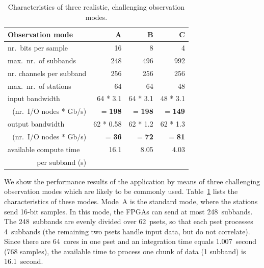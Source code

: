 \documentclass{sig-alternate}
\begin{document}
\begin{table}[ht]
\begin{center}
\begin{small}
\begin{tabular}{|l|rrr|}
\hline
Observation mode	 & \textsf{A}	& \textsf{B}	& \textsf{C}	\\
\hline
nr.\ bits per sample	 & 16		& 8		& 4	\\
max.\ nr.\ of subbands	 & 248		& 496		& 992	\\
nr. channels per subband & 256		& 256		& 256	\\
max.\ nr.\ of stations	 & 64		& 64		& 48	\\
\hline
input bandwidth & 64 * 3.1  & 64 * 3.1 & 48 * 3.1 \\
\multicolumn{1}{|r|}{(nr.\ I/O nodes * Gb/s)} & = \textbf{198} & = \textbf{198} & = \textbf{149} \\
output bandwidth & 62 * 0.58 & 62 * 1.2 & 62 * 1.3 \\
\multicolumn{1}{|r|}{(nr.\ I/O nodes * Gb/s)}  & = \textbf{36} & = \textbf{72} & = \textbf{81} \\
\hline
available compute time	 & 16.1	     & 8.05     & 4.03     \\
\multicolumn{1}{|r|}{per subband (s)}	 & & & \\
\hline
\end{tabular}
\end{small}
\end{center}
\caption{Characteristics of three realistic, challenging observation modes.}
\label{tab:observation-characteristics}
\end{table}

We show the performance results of the application by means of three
challenging observation modes which are likely to be commonly used.
Table~\ref{tab:observation-characteristics} lists the characteristics of these modes.
Mode~\textsf{A} is the standard mode, where the stations send 16-bit samples.
In this mode, the FPGAs can send at most 248~subbands.
The 248~subbands are evenly divided over 62~psets, so that each pset processes
4~subbands (the remaining two psets handle input data, but do not correlate).
Since there are 64~cores in one pset and an integration time equals
1.007~second (768 samples),
the available time to process one chunk of data (1 subband) is 16.1~second.
\end{document}
